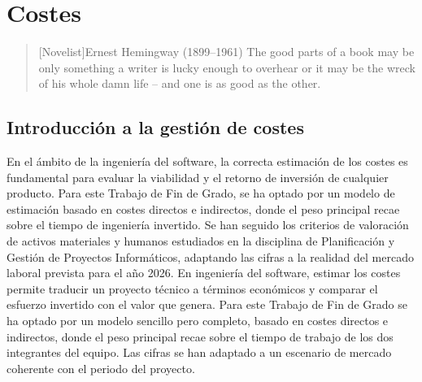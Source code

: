 \chapter{Costes}

\begin{quotation}[Novelist]{Ernest Hemingway (1899--1961)}
The good parts of a book may be only something a writer is lucky enough to overhear or it may be the wreck of his whole damn life -- and one is as good as the other.
\end{quotation}

\begin{abstract}
Este capítulo presenta un análisis económico detallado para determinar la inversión total requerida en el desarrollo de \textit{Via Inferni}. El estudio se fundamenta en los principios de gestión de costes en ingeniería de software, contemplando la valoración del capital humano basándose en estándares actuales del mercado tecnológico, la amortización del equipamiento físico y la imputación de gastos indirectos. Este análisis permite cuantificar el valor económico del proyecto de manera profesional, garantizando que todos los recursos empleados han sido debidamente valorados y justificados.
Este capítulo presenta una estimación económica del proyecto \textit{Via Inferni}. El objetivo no es reflejar un gasto real de mercado en sentido estricto, sino ofrecer una valoración razonada del trabajo realizado aplicando criterios habituales de ingeniería de software: coste de personal, amortización de equipamiento y gastos indirectos. De este modo se obtiene una imagen más completa del valor económico del TFG y se justifica el esfuerzo invertido en su desarrollo.
\end{abstract}

\section{Introducción a la gestión de costes}
En el ámbito de la ingeniería del software, la correcta estimación de los costes es fundamental para evaluar la viabilidad y el retorno de inversión de cualquier producto. Para este Trabajo de Fin de Grado, se ha optado por un modelo de estimación basado en costes directos e indirectos, donde el peso principal recae sobre el tiempo de ingeniería invertido. Se han seguido los criterios de valoración de activos materiales y humanos estudiados en la disciplina de Planificación y Gestión de Proyectos Informáticos, adaptando las cifras a la realidad del mercado laboral prevista para el año 2026.
En ingeniería del software, estimar los costes permite traducir un proyecto técnico a términos económicos y comparar el esfuerzo invertido con el valor que genera. Para este Trabajo de Fin de Grado se ha optado por un modelo sencillo pero completo, basado en costes directos e indirectos, donde el peso principal recae sobre el tiempo de trabajo de los dos integrantes del equipo. Las cifras se han adaptado a un escenario de mercado coherente con el periodo del proyecto.


